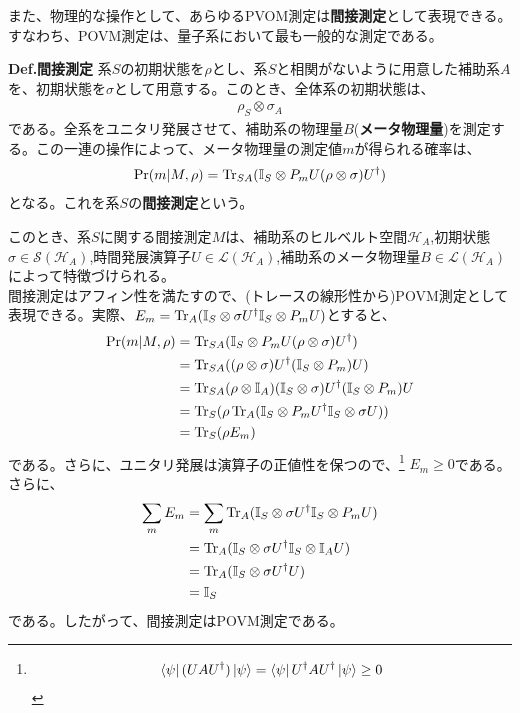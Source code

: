 \documentclass[a4paper,11pt]{jsarticle}
\numberwithin{equation}{section}
\begin{document}
また、物理的な操作として、あらゆるPVOM測定は\textbf{間接測定}として表現できる。すなわち、POVM測定は、量子系において最も一般的な測定である。
\begin{itembox}[l]{\textbf{Def.間接測定}}
    系$S$の初期状態を$\rho$とし、系$S$と相関がないように用意した補助系$A$を、初期状態を$\sigma$として用意する。このとき、全体系の初期状態は、
    \begin{align}
        \rho_S \otimes \sigma_A
    \end{align}
    である。全系をユニタリ発展させて、補助系の物理量$B$(\textbf{メータ物理量})を測定する。この一連の操作によって、メータ物理量の測定値$m$が得られる確率は、
    \begin{align}
        \Pr(m|M,\rho) = \Tr_{SA}(\mathbb{I}_S \otimes P_m U (\rho \otimes \sigma)U^\dagger)
    \end{align}
    となる。これを系$S$の\textbf{間接測定}という。
\end{itembox}
このとき、系$S$に関する間接測定$M$は、補助系のヒルベルト空間$\mathcal{H}_A$,初期状態$\sigma \in \mathcal{S}(\mathcal{H}_A)$,時間発展演算子$U \in \mathcal{L}(\mathcal{H}_A)$,補助系のメータ物理量$B \in \mathcal{L}(\mathcal{H}_A)$によって特徴づけられる。\\
間接測定はアフィン性を満たすので、(トレースの線形性から)POVM測定として表現できる。実際、$E_m = \Tr_A(\mathbb{I}_S \otimes \sigma U^\dagger \mathbb{I}_S \otimes P_m U)$とすると、
\begin{align}
    \Pr(m|M,\rho) &=  \Tr_{SA}(\mathbb{I}_S \otimes P_m U (\rho \otimes \sigma)U^\dagger)\\
    &= \Tr_{SA}((\rho \otimes \sigma)U^\dagger (\mathbb{I}_S \otimes P_m)U)\\
    &= \Tr_{SA}(\rho \otimes \mathbb{I}_A)(\mathbb{I}_S \otimes \sigma)U^\dagger (\mathbb{I}_S \otimes P_m)U\\
    &= \Tr_{S}(\rho \Tr_A(\mathbb{I}_S \otimes P_m U^\dagger \mathbb{I}_S \otimes \sigma U))\\
    &= \Tr_{S}(\rho E_m)
\end{align}
である。さらに、ユニタリ発展は演算子の正値性を保つので、\footnote{
    \begin{align}
    \bra{\psi}(UAU^\dagger)\ket{\psi} = \bra{\psi}U^\dagger A U^\dagger\ket{\psi} \geq 0
    \end{align}
}
$E_m \geq 0$である。さらに、
\begin{align}
    \sum_m E_m &= \sum_m \Tr_A(\mathbb{I}_S \otimes \sigma U^\dagger \mathbb{I}_S \otimes P_m U)\\
    &= \Tr_A(\mathbb{I}_S \otimes \sigma U^\dagger \mathbb{I}_S \otimes \mathbb{I}_A U)\\
    &= \Tr_A(\mathbb{I}_S \otimes \sigma U^\dagger U)\\
    &= \mathbb{I}_S
\end{align}
である。したがって、間接測定はPOVM測定である。\\
\end{document}
